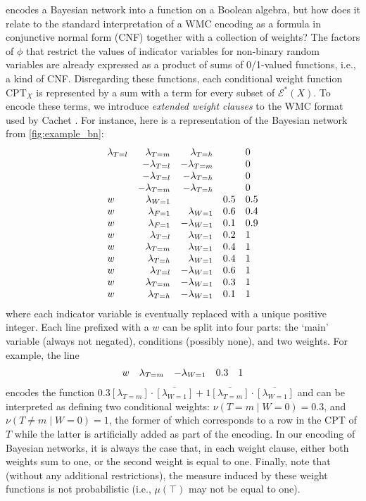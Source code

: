\documentclass{article}
\theoremstyle{definition}
\theoremstyle{remark}
\begin{document}
{ encodes a Bayesian network into a function on a Boolean
algebra, but how does it relate to the standard interpretation of a WMC encoding
as a formula in conjunctive normal form (CNF) together with a collection of
weights? The factors of $\phi$ that restrict the values of indicator variables
for non-binary random variables are already expressed as a product of sums of
0/1-valued functions, i.e., a kind of CNF. Disregarding these functions, each
conditional weight function $\mathrm{CPT}_X$ is represented by a sum with a term
for every subset of $\mathcal{E}^*(X)$. To encode these terms, we introduce
\emph{extended weight clauses} to the WMC format used by Cachet
\cite{DBLP:conf/sat/SangBBKP04}. For instance, here is a representation of the
Bayesian network from \cref{fig:example_bn}:
\[
  \begin{array}{lrrll}
    \lambda\sb{T=l} &\lambda\sb{T=m} &\lambda\sb{T=h} & &0 \\
                    &-\lambda\sb{T=l} &-\lambda\sb{T=m} & &0 \\
                    &-\lambda\sb{T=l} &-\lambda\sb{T=h} & &0 \\
                    &-\lambda\sb{T=m} &-\lambda\sb{T=h} & &0 \\
    w &\lambda\sb{W=1} & &0.5 &0.5 \\
    w &\lambda\sb{F=1} &\lambda\sb{W=1} &0.6 &0.4 \\
    w &\lambda\sb{F=1} &-\lambda\sb{W=1} &0.1 &0.9 \\
    w &\lambda\sb{T=l} &\lambda\sb{W=1} &0.2 &1 \\
    w &\lambda\sb{T=m} &\lambda\sb{W=1} &0.4 &1 \\
    w &\lambda\sb{T=h} &\lambda\sb{W=1} &0.4 &1 \\
    w &\lambda\sb{T=l} &-\lambda\sb{W=1} &0.6 &1 \\
    w &\lambda\sb{T=m} &-\lambda\sb{W=1} &0.3 &1 \\
    w &\lambda\sb{T=h} &-\lambda\sb{W=1} &0.1 &1
  \end{array}
\]
where each indicator variable is eventually replaced with a unique positive
integer. Each line prefixed with a $w$ can be split into four parts: the `main'
variable (always not negated), conditions (possibly none), and two weights. For
example, the line
\[
  \begin{array}{lrrll}
    w &\lambda\sb{T=m} &-\lambda\sb{W=1} &0.3 &1
  \end{array}
\]
encodes the function $0.3[\lambda_{T=m}] \cdot \overline{[\lambda_{W=1}]} +
1\overline{[\lambda_{T=m}]} \cdot \overline{[\lambda_{W=1}]}$ and can be
interpreted as defining two conditional weights: $\nu(T = m \mid W = 0) = 0.3$,
and $\nu(T \ne m \mid W = 0) = 1$, the former of which corresponds to a row in
the CPT of $T$ while the latter is artificially added as part of the encoding.
In our encoding of Bayesian networks, it is always the case that, in each weight
clause, either both weights sum to one, or the second weight is equal to one.
Finally, note that (without any additional restrictions), the measure induced by
these weight functions is not probabilistic (i.e., $\mu(\top)$ may not be equal
to one).

}
\end{document}
